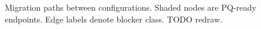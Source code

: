 %
\begin{figure}[t]
  \centering
  \caption{Migration paths between configurations. Shaded nodes are
    PQ-ready endpoints. Edge labels denote blocker class. TODO redraw.}
  \label{fig:migration}
\end{figure}

